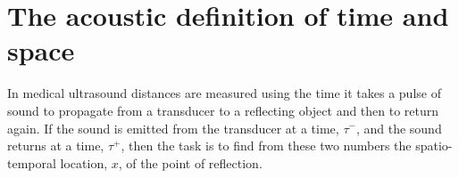 \documentclass[10pt, fleqn,final,showtrims,oldfontcommands, article,a4paper,oneside]{memoir} %
\newcommand{\secref}[1]{section~\ref{sec:#1}}
\newcommand{\tm}{\tau^-}
\newcommand{\tp}{\tau^+}
\newcommand{\aetherial}{\ae therial}
\newcommand{\Poincare}{Poincar{\'e}\xspace}
\begin{document}










\section{The acoustic definition of time and space}\label{sec:measurement}


In medical ultrasound distances are measured using the time it takes a pulse of sound to propagate from a transducer
to a reflecting object and then to return again. 
If the sound is emitted from the transducer at a time, $\tm$,
and the sound returns at a time,  $\tp$,
then the task is to find from these two numbers the spatio-temporal location, $x$,
of the point of reflection.
\end{document}
